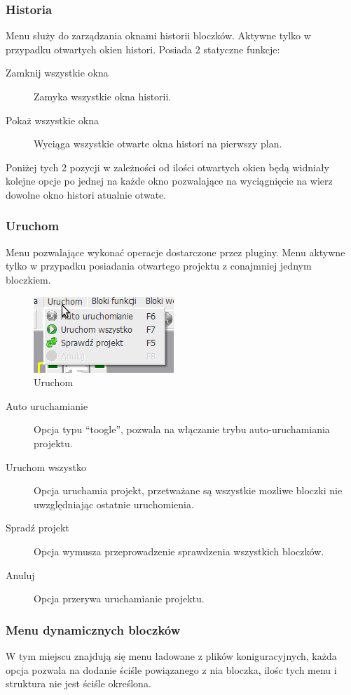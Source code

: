 \documentclass[a4paper,10pt]{article}
\begin{document}
\subsubsection{Historia}
Menu służy do zarządzania oknami historii bloczków. Aktywne tylko w przypadku otwartych okien histori. Posiada 2 statyczne funkcje:
\begin{description}
\item[Zamknij wszystkie okna] Zamyka wszystkie okna historii. 
\item[Pokaż wszystkie okna] Wyciąga wszystkie otwarte okna histori na pierwszy plan.
\end{description}
Poniżej tych 2 pozycji w zależności od ilości otwartych okien będą widniały kolejne opcje po jednej na każde okno pozwalające na wyciągnięcie na wierz dowolne okno histori atualnie otwate.

\subsubsection{Uruchom}
Menu pozwalające wykonać operacje dostarczone przez pluginy. Menu aktywne tylko w przypadku posiadania otwartego projektu z conajmniej jednym bloczkiem.
\begin{figure}[h]
 \centering
 \includegraphics[scale=0.5]{uruchom}
 \caption{Uruchom}
 \label{fig:Run}
\end{figure}
\begin{description}
\item [Auto uruchamianie] Opcja typu ``toogle'', pozwala na włączanie trybu auto-uruchamiania projektu.
\item [Uruchom wszystko] Opcja uruchamia projekt, przetważane są wszystkie mozliwe bloczki nie uwzględniając ostatnie uruchomienia.
\item [Spradź projekt] Opcja wymusza przeprowadzenie sprawdzenia wszystkich bloczków.
\item [Anuluj] Opcja przerywa uruchamianie projektu.
\end{description}

\subsubsection{Menu dynamicznych bloczków}
W tym miejscu znajdują się menu ładowane z plików koniguracyjnych, każda opcja pozwala na dodanie ściśle powiązanego z nia bloczka, ilośc tych menu i struktura nie jest ściśle określona.
\end{document}
